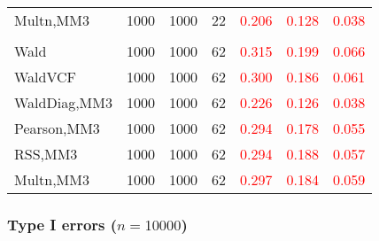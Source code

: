 \documentclass[
]{article}
\begin{document}
\begin{table}[H]
{\begin{tabular}[t]{lrrrrrr}
\hspace{1em}Multn,MM3 & 1000 & 1000 & 22 & \textcolor{red}{0.206} & \textcolor{red}{0.128} & \textcolor{red}{0.038}\\
\addlinespace[0.3em]
\multicolumn{7}{l}{\textbf{3F 15V}}\\
\hspace{1em}Wald & 1000 & 1000 & 62 & \textcolor{red}{0.315} & \textcolor{red}{0.199} & \textcolor{red}{0.066}\\
\hspace{1em}WaldVCF & 1000 & 1000 & 62 & \textcolor{red}{0.300} & \textcolor{red}{0.186} & \textcolor{red}{0.061}\\
\hspace{1em}WaldDiag,MM3 & 1000 & 1000 & 62 & \textcolor{red}{0.226} & \textcolor{red}{0.126} & \textcolor{red}{0.038}\\
\hspace{1em}Pearson,MM3 & 1000 & 1000 & 62 & \textcolor{red}{0.294} & \textcolor{red}{0.178} & \textcolor{red}{0.055}\\
\hspace{1em}RSS,MM3 & 1000 & 1000 & 62 & \textcolor{red}{0.294} & \textcolor{red}{0.188} & \textcolor{red}{0.057}\\
\hspace{1em}Multn,MM3 & 1000 & 1000 & 62 & \textcolor{red}{0.297} & \textcolor{red}{0.184} & \textcolor{red}{0.059}\\
\bottomrule
\end{tabular}}
\endgroup{}
\end{table}

\hypertarget{type-i-errors-n10000-1}{%
\subsubsection{\texorpdfstring{Type I errors
(\(n=10000\))}{Type I errors (n=10000)}}\label{type-i-errors-n10000-1}}
\end{document}
